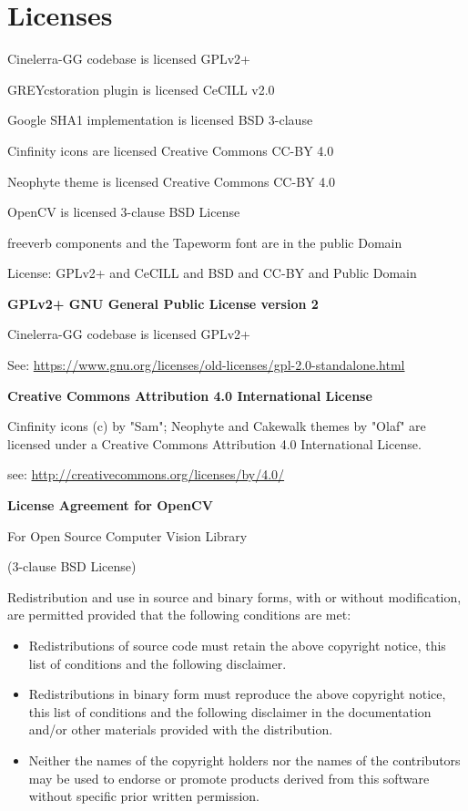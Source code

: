 \chapter{Licenses}%
\label{cha:licenses}

Cinelerra-GG codebase is licensed GPLv2+

GREYcstoration plugin is licensed CeCILL v2.0

Google SHA1 implementation is licensed BSD 3-clause

Cinfinity icons are licensed Creative Commons CC-BY 4.0

Neophyte theme is licensed Creative Commons CC-BY 4.0

OpenCV is licensed 3-clause BSD License

freeverb components and the Tapeworm font are in the public Domain

License: GPLv2+ and CeCILL and BSD and CC-BY and Public Domain

\vspace{2ex} \textbf{GPLv2+ \qquad   GNU General Public License version 2}

Cinelerra-GG codebase is licensed GPLv2+ 

See: {\small \url{https://www.gnu.org/licenses/old-licenses/gpl-2.0-standalone.html }}

\vspace{2ex} \textbf{Creative Commons Attribution 4.0 International License}

Cinfinity icons (c) by "Sam"; Neophyte and Cakewalk themes by "Olaf" are licensed under a
Creative Commons Attribution 4.0 International License.

see: {\small \url{http://creativecommons.org/licenses/by/4.0/}}

\vspace{2ex} \textbf{License Agreement for OpenCV}

\begin{center}
For Open Source Computer Vision Library

(3-clause BSD License)
\end{center}

Redistribution and use in source and binary forms, with or without modification, are permitted provided that the following conditions are met:

\begin{itemize}
	\item Redistributions of source code must retain the above copyright notice, this list of conditions and the following disclaimer.
	\item Redistributions in binary form must reproduce the above copyright notice, this list of conditions and the following disclaimer in the documentation and/or other materials provided with the distribution.
	\item Neither the names of the copyright holders nor the names of the contributors may be used to endorse or promote products derived from this software without specific prior written permission.
\end{itemize}

